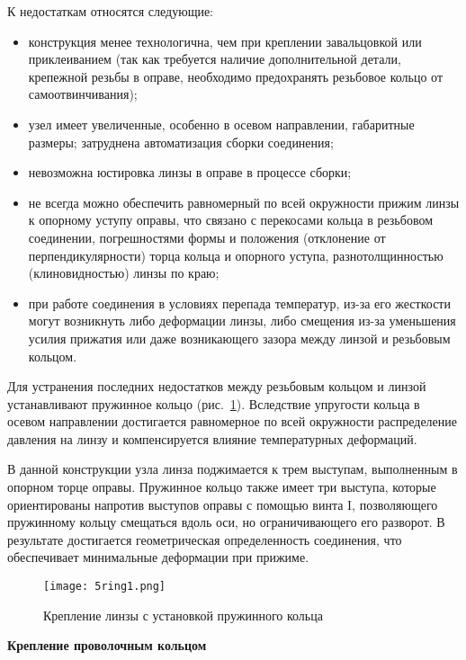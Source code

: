 К недостаткам относятся следующие:
\begin{itemize}
\item конструкция менее технологична, чем при креплении завальцовкой или приклеиванием (так как требуется наличие дополнительной детали, крепежной резьбы в оправе, необходимо предохранять резьбовое кольцо от самоотвинчивания);
\item узел имеет увеличенные, особенно в осевом направлении, габаритные размеры; затруднена автоматизация сборки соединения;
\item невозможна юстировка линзы в оправе в процессе сборки;
\item не всегда можно обеспечить равномерный по всей окружности прижим линзы к опорному уступу оправы, что связано с перекосами кольца в резьбовом соединении, погрешностями формы и положения (отклонение от перпендикулярности) торца кольца и опорного уступа, разнотолщинностью (клиновидностью) линзы по краю;
\item при работе соединения в условиях перепада температур, из-за его жесткости могут возникнуть либо деформации линзы, либо смещения из-за уменьшения усилия прижатия или даже возникающего зазора между линзой и резьбовым кольцом.
\end{itemize}

Для устранения последних недостатков между резьбовым кольцом и линзой устанавливают пружинное кольцо (рис.~\ref{pic:5ring1}). Вследствие упругости кольца в осевом направлении достигается равномерное по всей окружности распределение давления на линзу и компенсируется влияние температурных деформаций. 

В данной конструкции узла линза поджимается к трем выступам, выполненным в опорном торце оправы. Пружинное кольцо также имеет три выступа, которые ориентированы напротив выступов оправы с помощью винта I, позволяющего   пружинному кольцу смещаться вдоль оси, но ограничивающего его разворот. В результате достигается геометрическая определенность соединения, что обеспечивает минимальные деформации при прижиме.

\begin{figure}[h!]
	\caption{ Крепление линзы с установкой пружинного кольца }
	\texttt{[image: 5ring1.png]}
	\label{pic:5ring1}
\end{figure}

\begin{flushleft}
	\textbf{Крепление проволочным кольцом}
\end{flushleft}

